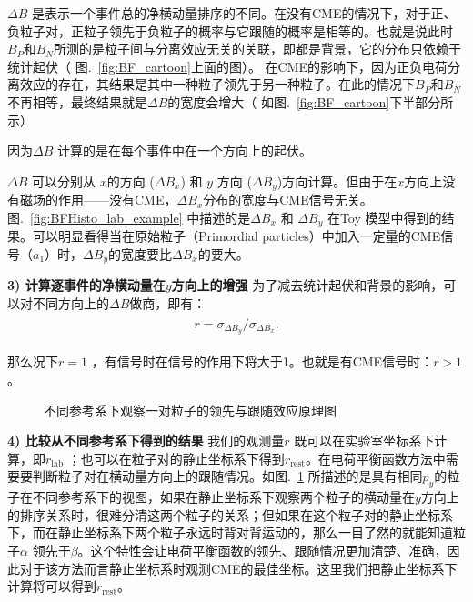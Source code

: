 $\Delta B$ 是表示一个事件总的净横动量排序的不同。在没有CME的情况下，对于正、负粒子对，正粒子领先于负粒子的概率与它跟随的概率是相等的。也就是说此时$B_P$和$B_N$所测的是粒子间与分离效应无关的关联，即都是背景，它的分布只依赖于统计起伏（ 图.~\ref{fig:BF_cartoon}上面的图）。 在CME的影响下，因为正负电荷分离效应的存在，其结果是其中一种粒子领先于另一种粒子。在此的情况下$B_P$和$B_N$不再相等，最终结果就是$\Delta B$的宽度会增大（ 如图.~\ref{fig:BF_cartoon}下半部分所示）

因为$\Delta B$ 计算的是在每个事件中在一个方向上的起伏。

$\Delta B$ 可以分别从 $x$的方向 ($\Delta B_{x}$) 和 $y$ 方向 ($\Delta B_{y}$)方向计算。但由于在$x$方向上没有磁场的作用——没有CME，$\Delta B_{x}$分布的宽度与CME信号无关。图.~\ref{fig:BFHisto_lab_example} 中描述的是$\Delta B_{x}$ 和 $\Delta B_{y}$ 在Toy 模型中得到的结果。可以明显看得当在原始粒子（Primordial particles）中加入一定量的CME信号（$a_1$）时，$\Delta B_y$的宽度要比$\Delta B_x$的要大。


\textbf{3) 计算逐事件的净横动量在$y$方向上的增强} 为了减去统计起伏和背景的影响，可以对不同方向上的$\Delta B$做商，即有：
\begin{eqnarray}
\begin{aligned}
r= \sigma_{\Delta B_y} / \sigma_{\Delta B_{x}}.
\end{aligned}
\label{eq:r}
\end{eqnarray}

那么况下$r=1$ ，有信号时在信号的作用下将大于1。也就是有CME信号时：$r > 1$。

\begin{figure}[htbp]
\centering
{}
\caption{不同参考系下观察一对粒子的领先与跟随效应原理图~\cite{Tang2019}}
\label{fig:boost_cartoon}
\end{figure}

\textbf{4) 比较从不同参考系下得到的结果 } 我们的观测量$r$ 既可以在实验室坐标系下计算，即$r_{\mathrm{lab}}$ ；也可以在粒子对的静止坐标系下得到$r_{\mathrm{rest}}$。在电荷平衡函数方法中需要要判断粒子对在横动量方向上的跟随情况。如图.~\ref{fig:boost_cartoon} 所描述的是具有相同$p_y$的粒子在不同参考系下的视图，如果在静止坐标系下观察两个粒子的横动量在$y$方向上的排序关系时，很难分清这两个粒子的关系；但如果在这个粒子对的静止坐标系下，而在静止坐标系下两个粒子永远时背对背运动的，那么一目了然的就能知道粒子$\alpha$ 领先于$\beta$。这个特性会让电荷平衡函数的领先、跟随情况更加清楚、准确，因此对于该方法而言静止坐标系时观测CME的最佳坐标。这里我们把静止坐标系下计算将可以得到$r_{\mathrm{rest}}$。

